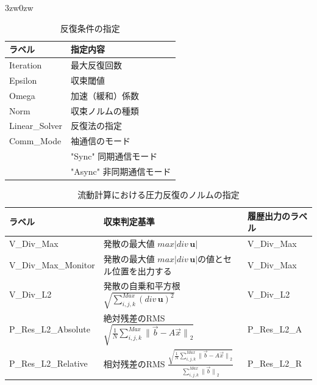 \begin{indentation}{3zw}{0zw}
\begin{table}[htdp]
\caption{反復条件の指定}
\begin{center}
\small
\begin{tabular}{ll} \toprule
ラベル & 指定内容\\ \midrule
Iteration & 最大反復回数\\
Epsilon & 収束閾値\\
Omega & 加速（緩和）係数\\
Norm & 収束ノルムの種類\\ 
Linear\_Solver & 反復法の指定\\ \hline
Comm\_Mode & 袖通信のモード\\
 & "Sync" 同期通信モード\\
 & "Async" 非同期通信モード\\ \bottomrule
\end{tabular}
\end{center}
\label{tbl:flow_itr}
\end{table}

\begin{table}[htdp]
\caption{流動計算における圧力反復のノルムの指定}
\begin{center}
\small
\begin{tabular}{lll} \toprule
ラベル & 収束判定基準 & 履歴出力のラベル\\ \midrule
V\_Div\_Max & 発散の最大値 $max\left|div\,\bm{u}\right|$ & V\_Div\_Max\\
\vspace{2mm}
V\_Div\_Max\_Monitor & 発散の最大値 $max\left|div\,\bm{u}\right|$の値とセル位置を出力する\footnotemark[1] & V\_Div\_Max\\
\vspace{2mm}
V\_Div\_L2 & 発散の自乗和平方根 $\displaystyle \sqrt{ \sum_{i,j,k}^{Max}{{( {div\,\bm{u}} )}^2}}$ & V\_Div\_L2\\
\vspace{2mm}
P\_Res\_L2\_Absolute & 絶対残差のRMS $\displaystyle \sqrt{ \frac{1}{N} \sum_{i,j,k}^{Max} {\|\vec{b}- A \vec{x}\|}_{2} }$ & P\_Res\_L2\_A\\ 
P\_Res\_L2\_Relative & 相対残差のRMS $\displaystyle {\frac{ \sqrt{ \frac{1}{N} \sum_{i,j,k}^{Max}{\|\vec{b}- A \vec{x}\|}_{2}} } {\sum_{i,j,k}^{Max} {\|\vec{b}\|}_{2} }}$ & P\_Res\_L2\_R\\ \bottomrule
\end{tabular}
\end{center}
\label{tbl:norm-type}
\end{table}


\end{indentation}
